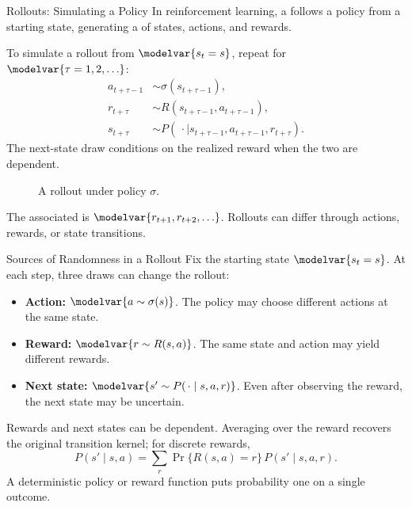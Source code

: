 \begin{frame}{Rollouts: Simulating a Policy}
\small
In reinforcement learning, a  follows a policy from a starting state, generating a  of states, actions, and rewards.
\par\smallskip
To simulate a rollout from \(\modelvar{s_t=s}\), repeat for \(\modelvar{\tau=1,2,\ldots}\):
\begin{align*}
a_{t+\tau-1}&\sim\sigma(s_{t+\tau-1}),\\
r_{t+\tau}&\sim R(s_{t+\tau-1},a_{t+\tau-1}),\\
s_{t+\tau}&\sim P(\,\cdot\mid s_{t+\tau-1},a_{t+\tau-1},r_{t+\tau}).
\end{align*}
The next-state draw conditions on the realized reward when the two are dependent.
\begin{figure}
\centering
{}
\caption{A rollout under policy \(\sigma\).}
\end{figure}
The associated  is \(\modelvar{r_{t+1},r_{t+2},\ldots}\).
Rollouts can differ through actions, rewards, or state transitions.
\end{frame}

\begin{frame}{Sources of Randomness in a Rollout}
Fix the starting state \(\modelvar{s_t=s}\). At each step, three draws can change the rollout:
\begin{itemize}
\item \textbf{Action:} \(\modelvar{a\sim\sigma(s)}\). The policy may choose different actions at the same state.
\item \textbf{Reward:} \(\modelvar{r\sim R(s,a)}\). The same state and action may yield different rewards.
\item \textbf{Next state:} \(\modelvar{s'\sim P(\,\cdot\mid s,a,r)}\). Even after observing the reward, the next state may be uncertain.
\end{itemize}
\small
Rewards and next states can be dependent. Averaging over the reward recovers the original transition kernel; for discrete rewards,
\[P(s'\mid s,a)=\sum_r\Pr\{R(s,a)=r\}\,P(s'\mid s,a,r).\]
A deterministic policy or reward function puts probability one on a single outcome.
\end{frame}

